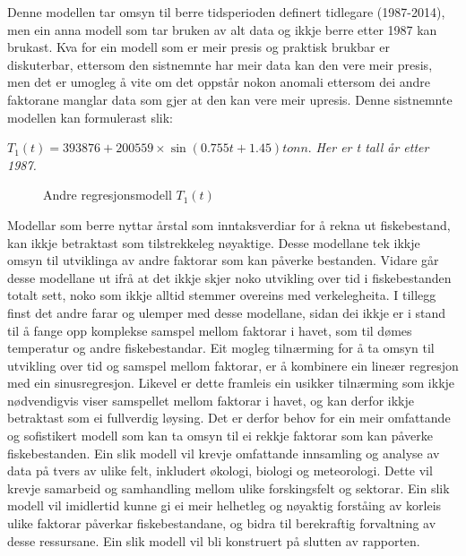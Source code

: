 \documentclass{report}
\begin{document}
Denne modellen tar omsyn til berre tidsperioden definert tidlegare (1987-2014), men ein anna modell som tar bruken av alt data og ikkje berre etter 1987 kan brukast.
Kva for ein modell som er meir presis og praktisk brukbar er diskuterbar, ettersom den sistnemnte har meir data kan den vere meir presis, men det er umogleg å vite om det oppstår nokon anomali ettersom dei andre faktorane manglar data som gjer at den kan vere meir upresis.
Denne sistnemnte modellen kan formulerast slik:
\begin{center}
	$T_{1}(t) = 393876+200559\times \sin(0.755t+1.45)tonn.$
	\textit{Her er t tall år etter 1987.}
\end{center}

\begin{figure}[H]
	\centering
	\caption{Andre regresjonsmodell $T_1(t)$}
	\label{T1}
\end{figure}

Modellar som berre nyttar årstal som inntaksverdiar for å rekna ut fiskebestand, kan ikkje betraktast som tilstrekkeleg nøyaktige. Desse modellane tek ikkje omsyn til utviklinga av andre faktorar som kan påverke bestanden. Vidare går desse modellane ut ifrå at det ikkje skjer noko utvikling over tid i fiskebestanden totalt sett, noko som ikkje alltid stemmer overeins med verkelegheita. I tillegg finst det andre farar og ulemper med desse modellane, sidan dei ikkje er i stand til å fange opp komplekse samspel mellom faktorar i havet, som til dømes temperatur og andre fiskebestandar.
Eit mogleg tilnærming for å ta omsyn til utvikling over tid og samspel mellom faktorar, er å kombinere ein lineær regresjon med ein sinusregresjon. Likevel er dette framleis ein usikker tilnærming som ikkje nødvendigvis viser samspellet mellom faktorar i havet, og kan derfor ikkje betraktast som ei fullverdig løysing.
Det er derfor behov for ein meir omfattande og sofistikert modell som kan ta omsyn til ei rekkje faktorar som kan påverke fiskebestanden. Ein slik modell vil krevje omfattande innsamling og analyse av data på tvers av ulike felt, inkludert økologi, biologi og meteorologi. Dette vil krevje samarbeid og samhandling mellom ulike forskingsfelt og sektorar. Ein slik modell vil imidlertid kunne gi ei meir helhetleg og nøyaktig forståing av korleis ulike faktorar påverkar fiskebestandane, og bidra til berekraftig forvaltning av desse ressursane.
Ein slik modell vil bli konstruert på slutten av rapporten.
\end{document}
